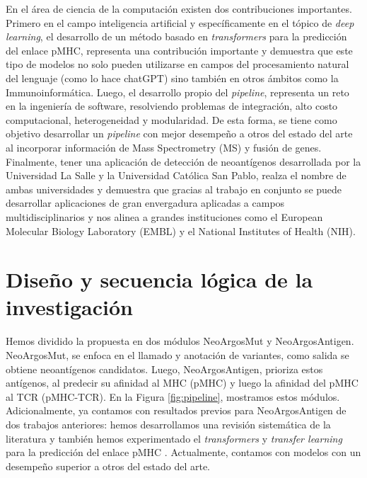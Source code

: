 \documentclass[a4paper]{article}
\begin{document}
En el área de ciencia de la computación existen dos contribuciones importantes. Primero en el campo inteligencia artificial y específicamente en el tópico de \textit{deep learning}, el desarrollo de un método basado en \textit{transformers} para la predicción del enlace pMHC, representa una contribución importante  y demuestra que este tipo de modelos no solo pueden utilizarse en campos del procesamiento natural del lenguaje (como lo hace chatGPT) sino también en otros ámbitos como la Immunoinformática. Luego, el desarrollo propio del \textit{pipeline}, representa un reto en la ingeniería de software, resolviendo problemas de integración, alto costo computacional, heterogeneidad y modularidad. De esta forma, se tiene como objetivo desarrollar un \textit{pipeline} con mejor desempeño a otros del estado del arte al incorporar información de Mass Spectrometry (MS) y fusión de genes.\\ 

Finalmente, tener una aplicación de detección de neoantígenos desarrollada por la Universidad La Salle y la Universidad Católica San Pablo, realza el nombre de ambas universidades y demuestra que gracias al trabajo en conjunto se puede desarrollar aplicaciones de gran envergadura aplicadas a campos multidisciplinarios y nos alinea a grandes instituciones como el European Molecular Biology Laboratory (EMBL) y el National Institutes of Health (NIH).




\section{Diseño y secuencia lógica de la investigación} 

Hemos dividido la propuesta en dos módulos NeoArgosMut y NeoArgosAntigen. NeoArgosMut, se enfoca en el llamado y anotación de variantes, como salida se obtiene neoantígenos candidatos. Luego, NeoArgosAntigen, prioriza estos antígenos, al predecir su afinidad al MHC (pMHC) y luego la afinidad del pMHC al TCR (pMHC-TCR). En la Figura \ref{fig:pipeline}, mostramos estos módulos. Adicionalmente, ya contamos con resultados previos para NeoArgosAntigen de dos trabajos anteriores: hemos desarrollamos una revisión sistemática de la literatura \citep{machaca2023deep} y también hemos experimentado el \textit{transformers} y \textit{transfer learning} para la predicción del enlace pMHC \citep{arceda2023neoantigen}. Actualmente, contamos con modelos con un desempeño superior a otros del estado del arte.
\end{document}
